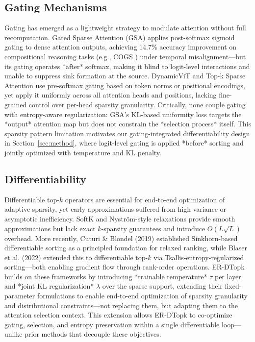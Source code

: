 \documentclass{article}
\begin{document}
\subsection{Gating Mechanisms}
Gating has emerged as a lightweight strategy to modulate attention without full recomputation. Gated Sparse Attention (GSA) \cite{shen2026} applies post-softmax sigmoid gating to dense attention outputs, achieving 14.7\% accuracy improvement on compositional reasoning tasks (e.g., COGS \cite{kim2020}) under temporal misalignment---but its gating operates *after* softmax, making it blind to logit-level interactions and unable to suppress sink formation at the source. DynamicViT \cite{rao2021} and Top-k Sparse Attention \cite{zhou2022} use pre-softmax gating based on token norms or positional encodings, yet apply it uniformly across all attention heads and positions, lacking fine-grained control over per-head sparsity granularity. Critically, none couple gating with entropy-aware regularization: GSA's KL-based uniformity loss targets the *output* attention map but does not constrain the *selection process* itself. This sparsity pattern limitation motivates our gating-integrated differentiability design in Section~\ref{sec:method}, where logit-level gating is applied *before* sorting and jointly optimized with temperature and KL penalty.

\subsection{Differentiability}
Differentiable top-$k$ operators are essential for end-to-end optimization of adaptive sparsity, yet early approximations suffered from high variance or asymptotic inefficiency. SoftK \cite{grover2019} and Nyström-style relaxations \cite{xiang2021} provide smooth approximations but lack exact $k$-sparsity guarantees and introduce $O(L\sqrt{L})$ overhead. More recently, Cuturi \& Blondel (2019) established Sinkhorn-based differentiable sorting as a principled foundation for relaxed ranking, while Blaser et al. (2022) extended this to differentiable top-$k$ via Tsallis-entropy-regularized sorting---both enabling gradient flow through rank-order operations. ER-DTopk builds on these frameworks by introducing *trainable temperature* $\tau$ per layer and *joint KL regularization* $\lambda$ over the sparse support, extending their fixed-parameter formulations to enable end-to-end optimization of sparsity granularity and distributional constraints---not replacing them, but adapting them to the attention selection context. This extension allows ER-DTopk to co-optimize gating, selection, and entropy preservation within a single differentiable loop---unlike prior methods that decouple these objectives.
\end{document}
